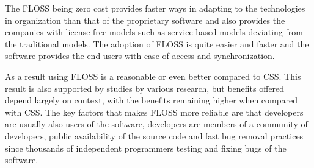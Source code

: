   The FLOSS being zero cost provides faster ways in adapting to the technologies in organization than that of the proprietary software and also provides the companies with license free models such as service based models deviating from the traditional models. The adoption of FLOSS is quite easier and faster and the software provides the end users with ease of access and synchronization.
  
  As a result using FLOSS is a reasonable or even better compared to CSS. This result is also supported by studies by various research, but benefits offered depend largely on context, with the benefits remaining higher when compared with CSS. The key factors that makes FLOSS more reliable are that developers are usually also users of the software, developers are members of a community of developers, public availability of the source code and fast bug removal practices since thousands of independent programmers testing and fixing bugs of the software.
